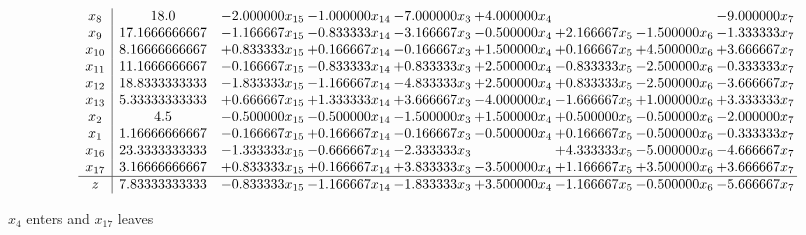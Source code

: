 \documentclass[10pt]{article}
\begin{document}
 \[\begin{array}{c| c c@{\hskip 2pt} c@{\hskip 2pt} c@{\hskip 2pt} c@{\hskip 2pt} c@{\hskip 2pt} c@{\hskip 2pt} c@{\hskip 2pt} }
 x_{8}   &  18.0 & -2.000000 x_{15} & -1.000000 x_{14} & -7.000000 x_{3} & + 4.000000 x_{4} &    &   & -9.000000 x_{7}\\
 x_{9}   &  17.1666666667 & -1.166667 x_{15} & -0.833333 x_{14} & -3.166667 x_{3} & -0.500000 x_{4} & + 2.166667 x_{5} & -1.500000 x_{6} & -1.333333 x_{7}\\
 x_{10}   &  8.16666666667 & + 0.833333 x_{15} & + 0.166667 x_{14} & -0.166667 x_{3} & + 1.500000 x_{4} & + 0.166667 x_{5} & + 4.500000 x_{6} & + 3.666667 x_{7}\\
 x_{11}   &  11.1666666667 & -0.166667 x_{15} & -0.833333 x_{14} & + 0.833333 x_{3} & + 2.500000 x_{4} & -0.833333 x_{5} & -2.500000 x_{6} & -0.333333 x_{7}\\
 x_{12}   &  18.8333333333 & -1.833333 x_{15} & -1.166667 x_{14} & -4.833333 x_{3} & + 2.500000 x_{4} & + 0.833333 x_{5} & -2.500000 x_{6} & -3.666667 x_{7}\\
 x_{13}   &  5.33333333333 & + 0.666667 x_{15} & + 1.333333 x_{14} & + 3.666667 x_{3} & -4.000000 x_{4} & -1.666667 x_{5} & + 1.000000 x_{6} & + 3.333333 x_{7}\\
 x_{2}   &  4.5 & -0.500000 x_{15} & -0.500000 x_{14} & -1.500000 x_{3} & + 1.500000 x_{4} & + 0.500000 x_{5} & -0.500000 x_{6} & -2.000000 x_{7}\\
 x_{1}   &  1.16666666667 & -0.166667 x_{15} & + 0.166667 x_{14} & -0.166667 x_{3} & -0.500000 x_{4} & + 0.166667 x_{5} & -0.500000 x_{6} & -0.333333 x_{7}\\
 x_{16}   &  23.3333333333 & -1.333333 x_{15} & -0.666667 x_{14} & -2.333333 x_{3} &   & + 4.333333 x_{5} & -5.000000 x_{6} & -4.666667 x_{7}\\
 x_{17}   &  3.16666666667 & + 0.833333 x_{15} & + 0.166667 x_{14} & + 3.833333 x_{3} & -3.500000 x_{4} & + 1.166667 x_{5} & + 3.500000 x_{6} & + 3.666667 x_{7}\\
\hline
z    &  7.83333333333 & -0.833333 x_{15} & -1.166667 x_{14} & -1.833333 x_{3} & + 3.500000 x_{4} & -1.166667 x_{5} & -0.500000 x_{6} & -5.666667 x_{7}\\
\end{array}\]


 $ x_{4} $ enters and $ x_{17} $ leaves 
\end{document}
